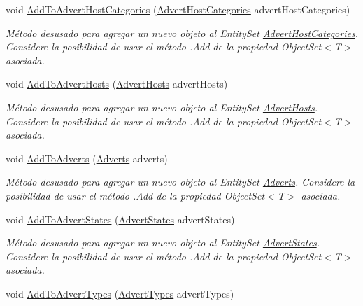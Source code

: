 \begin{DoxyCompactItemize}
void \hyperlink{class_game_memory_1_1_o_m_k_t_d_b_entities_a6639f5f52306d0ffd29181498836a880}{Add\-To\-Advert\-Host\-Categories} (\hyperlink{class_game_memory_1_1_advert_host_categories}{Advert\-Host\-Categories} advert\-Host\-Categories)
\begin{DoxyCompactList}\small\item\em Método desusado para agregar un nuevo objeto al Entity\-Set \hyperlink{class_game_memory_1_1_advert_host_categories}{Advert\-Host\-Categories}. Considere la posibilidad de usar el método .Add de la propiedad Object\-Set$<$T$>$ asociada. \end{DoxyCompactList}\item 
void \hyperlink{class_game_memory_1_1_o_m_k_t_d_b_entities_a882936b1bc8f11bf17d5532727d03c5b}{Add\-To\-Advert\-Hosts} (\hyperlink{class_game_memory_1_1_advert_hosts}{Advert\-Hosts} advert\-Hosts)
\begin{DoxyCompactList}\small\item\em Método desusado para agregar un nuevo objeto al Entity\-Set \hyperlink{class_game_memory_1_1_advert_hosts}{Advert\-Hosts}. Considere la posibilidad de usar el método .Add de la propiedad Object\-Set$<$T$>$ asociada. \end{DoxyCompactList}\item 
void \hyperlink{class_game_memory_1_1_o_m_k_t_d_b_entities_a141864354b614abef2757fefd2371116}{Add\-To\-Adverts} (\hyperlink{class_game_memory_1_1_adverts}{Adverts} adverts)
\begin{DoxyCompactList}\small\item\em Método desusado para agregar un nuevo objeto al Entity\-Set \hyperlink{class_game_memory_1_1_adverts}{Adverts}. Considere la posibilidad de usar el método .Add de la propiedad Object\-Set$<$T$>$ asociada. \end{DoxyCompactList}\item 
void \hyperlink{class_game_memory_1_1_o_m_k_t_d_b_entities_a89018467bbc55317db078f162456ce38}{Add\-To\-Advert\-States} (\hyperlink{class_game_memory_1_1_advert_states}{Advert\-States} advert\-States)
\begin{DoxyCompactList}\small\item\em Método desusado para agregar un nuevo objeto al Entity\-Set \hyperlink{class_game_memory_1_1_advert_states}{Advert\-States}. Considere la posibilidad de usar el método .Add de la propiedad Object\-Set$<$T$>$ asociada. \end{DoxyCompactList}\item 
void \hyperlink{class_game_memory_1_1_o_m_k_t_d_b_entities_a5285be4f02b9c7b324966a09f376f09e}{Add\-To\-Advert\-Types} (\hyperlink{class_game_memory_1_1_advert_types}{Advert\-Types} advert\-Types)

\end{DoxyCompactItemize}
